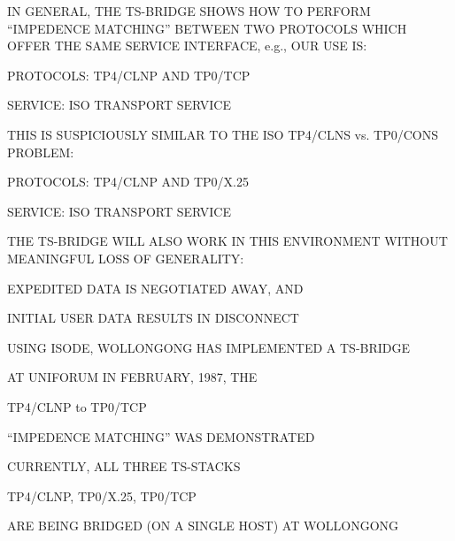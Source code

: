 \begin{bwslide}

\begin{nrtc}
\item	IN GENERAL, THE TS-BRIDGE SHOWS HOW TO PERFORM
	``IMPEDENCE MATCHING'' BETWEEN TWO PROTOCOLS WHICH OFFER THE
	SAME SERVICE INTERFACE, e.g., OUR USE IS:
    \begin{nrtc}
    \item	PROTOCOLS: TP4/CLNP AND TP0/TCP

    \item	SERVICE: ISO TRANSPORT SERVICE
    \end{nrtc}

\item	THIS IS SUSPICIOUSLY SIMILAR TO THE ISO TP4/CLNS vs. TP0/CONS PROBLEM:
    \begin{nrtc}
    \item	PROTOCOLS: TP4/CLNP AND TP0/X.25

    \item	SERVICE: ISO TRANSPORT SERVICE
    \end{nrtc}

\item	THE TS-BRIDGE WILL ALSO WORK IN THIS ENVIRONMENT WITHOUT
	MEANINGFUL LOSS OF GENERALITY:
    \begin{nrtc}
    \item	EXPEDITED DATA IS NEGOTIATED AWAY, AND

    \item	INITIAL USER DATA RESULTS IN DISCONNECT
    \end{nrtc}
\end{nrtc}
\end{bwslide}


\begin{bwslide}

\begin{nrtc}
\item	USING ISODE, WOLLONGONG HAS IMPLEMENTED A TS-BRIDGE

\item	AT UNIFORUM IN FEBRUARY, 1987, THE
    \begin{nrtc}
    \item	TP4/CLNP to TP0/TCP
    \end{nrtc}
    ``IMPEDENCE MATCHING'' WAS DEMONSTRATED

\item	CURRENTLY, ALL THREE TS-STACKS
    \begin{nrtc}
    \item	TP4/CLNP, TP0/X.25, TP0/TCP
    \end{nrtc}
    ARE BEING BRIDGED (ON A SINGLE HOST) AT WOLLONGONG
\end{nrtc}
\end{bwslide}


